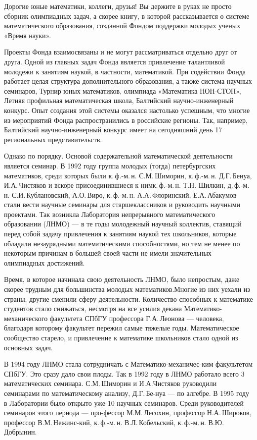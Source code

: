 \ms\abz Дорогие юные математики, коллеги, друзья! Вы держите в руках не просто сборник олимпиадных задач, а скорее книгу, в которой рассказывается о системе математического образования, созданной Фондом поддержки молодых ученых «Время науки».

\ms\abz Проекты Фонда взаимосвязаны и не могут рассматриваться отдельно друг от друга. Одной из главных задач Фонда является привлечение талантливой молодежи к занятиям наукой, в частности, математикой. При содействии Фонда работает целая структура дополнительного образования, а также система научных семинаров, Турнир юных математиков, олимпиада «Математика НОН-СТОП», Летняя профильная математическая школа, Балтийский научно-инженерный конкурс. Опыт создания этой системы оказался настолько успешным, что многие из мероприятий Фонда распространились в российские регионы. Так, например, Балтийский научно-инженерный конкурс имеет на сегодняшний день 17 региональных представительств.

\ms\abz Однако по порядку. Основой содержательной математической деятельности является семинар. В 1992 году группа  молодых (тогда) петербургских математиков, среди которых были к.\,ф.-м.\,н. С.М.\,Шиморин, к.\,ф.-м.\,н. Д.Г.\,Бенуа, И.А.\,Чистяков и вскоре присоединившиеся к ним\linebreak к.\,ф.-м.\,н. Т.Н. Шилкин, д.\,ф.-м.\,н. С.И.\,Кублановский, А.О.\,Виро, к.\,ф.-м.\,н. А.А.\,Флоринский, Е.А.\,Абакумов стали вести научные семинары для старшеклассников и руководить научными проектами. Так возникла Лаборатория непрерывного математического образовании (ЛНМО) — в те годы молодежный научный коллектив, ставящий перед собой задачу привлечения к занятиям наукой тех школьников, которые обладали незаурядными математическими способностями, но тем не менее по некоторым причинам в большей своей части не имели значительных олимпиадных достижений.

\ms\abz Время, в которое начинала свою деятельность ЛНМО, было непростым, даже скорее трудным для большинства молодых математиков.\linebreak Многие из них уехали из страны, другие сменили сферу деятельности. Количество способных к математике студентов стало снижаться, несмотря на все усилия декана Математико-механического факультета СПбГУ профессора Г.А.\,Леонова — человека, благодаря которому факультет пережил самые тяжелые годы. Математическое сообщество старело, и привлечение к математике школьников стало одной из основных задач.

\ms\abz В 1994 году ЛНМО стала сотрудничать с Математико-механичес-\linebreak ким факультетом СПбГУ. Это сразу дало свои плоды. Так в 1992 году в ЛНМО работало всего 3 математических семинара. С.М.\,Шиморин и И.А.\linebreak Чистяков руководили семинарами по математическому анализу, Д.Г.\,Бе-\linebreak нуа — по алгебре. В 1995 году в Лаборатории было открыто уже 10 научных семинаров. Среди руководителей семинаров этого периода — про-\linebreak фессор М.М.\,Лесохин, профессор Н.А.\,Широков, профессор В.М.\,Нежинс-\linebreak кий, к.\,ф.-м.\,н. В.Л.\,Кобельский, к.\,ф.-м.\,н. В.Ю.\,Добрынин.

